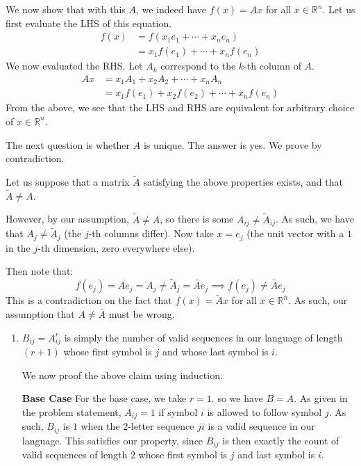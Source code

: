 \documentclass[12pt]{exam}
\newcommand{\Q}[1]{\question{\large{\textbf{#1}}}}
\begin{document}
\begin{questions}
\begin{solution}
We now show that with this $A$, we indeed have $f(x) = Ax$ for all $x \in \mathbb{R}^n$. Let us first evaluate the LHS of this equation.
\begin{align*}
f(x) &= f(x_1 e_1 + \cdots + x_n e_n) \tag{Decompose any $x$ as a linear combination of basis vectors $e_j$} \\
&= x_1f(e_1) + \cdots + x_nf(e_n) \tag{Linearity of $f$}
\end{align*}
We now evaluated the RHS. Let $A_k$ correspond to the $k$-th column of $A$.
\begin{align*}
  Ax &= x_1 A_1 + x_2 A_2 + \cdots + x_n A_n \tag{Defintion of matrix multiplication as a linear combination of matrix columns} \\
  &= x_1f(e_1) + x_2f(e_2) + \cdots + x_n f(e_n) \tag{Construction of $A$ as described above}
\end{align*}
From the above, we see that the LHS and RHS are equivalent for arbitrary choice of $x \in \mathbb{R}^n$. 

The next question is whether $A$ is unique. The answer is yes. We prove by contradiction. 

Let us suppose that a matrix $\tilde{A}$ satisfying the above properties exists, and that $\tilde{A} \neq A$.

However, by our assumption, $\tilde{A} \neq A$, so there is some $A_{ij} \neq \tilde{A}_{ij}$. As such, we have that $A_j \neq \tilde{A}_j$ (the $j$-th columns differ). Now take $x = e_j$ (the unit vector with a $1$ in the $j$-th dimension, zero everywhere else).

Then note that:
$$
f(e_j) = Ae_j = A_j \neq \tilde{A}_j = \bar{A}e_j \implies  f(e_j) \neq \bar{A}e_j
$$
This is a contradiction on the fact that $f(x) = \tilde{A}x$ for all $x \in \mathbb{R}^n$. As such, our assumption that $A \neq \bar{A}$ must be wrong.
\end{solution}

\newpage
\Q{Counting sequences in language code}
\begin{solution}
  \begin{enumerate}[label=(\alph*)]
    \item
      $B_{ij} = A^r_{ij}$ is simply the number of valid sequences in our language of length $(r+1)$ whose first symbol is $j$ and whose last symbol is $i$.

      We now proof the above claim using induction.

      \textbf{Base Case}
      For the base case, we take $r = 1$. so we have $B = A$. As given in the problem statement, $A_{ij} = 1$ if symbol $i$ is allowed to follow symbol $j$. As such, $B_{ij}$ is $1$ when the 2-letter sequence $ji$ is a valid sequence in our language. This satisfies our property, since $B_{ij}$ is then exactly the count of valid sequences of length $2$ whose first symbol is $j$ and last symbol is $i$.


\end{enumerate}
\end{solution}
\end{questions}
\end{document}
